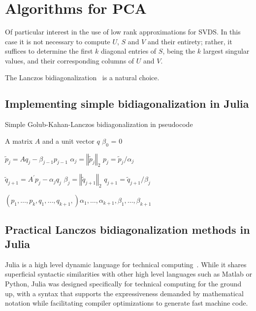\documentclass[review]{siamart0516}
\begin{document}
\section{Algorithms for PCA}

Of particular interest in the use of low rank approximations for SVDS.
In this case it is not necessary to compute $U$, $S$ and $V$ and
their entirety; rather, it suffices to determine the first $k$ diagonal
entries of $S$, being the $k$ largest singular values, and their
corresponding columns of $U$ and $V$.

The Lanczos bidiagonalization~\cite{Golub1965} is a natural choice.

\subsection{Implementing simple bidiagonalization in Julia}

\begin{algorithm}
\caption{Simple Golub-Kahan-Lanczos bidiagonalization in pseudocode}

\begin{algorithmic}
\REQUIRE A matrix $A$ and a unit vector $q$
\STATE $\beta_0$ = 0

\STATE $\tilde{p}_j = A q_j - \beta_{j-1} p_{j-1}$
\STATE $\alpha_j = \left\Vert \tilde{p}_j \right\Vert_2$
\STATE $p_j = \tilde{p}_j / \alpha_j$

\STATE $\tilde{q}_{j+1} = A^\prime p_j - \alpha_j q_j$
\STATE $\beta_j = \left\Vert \tilde{q}_{j+1} \right\Vert_2$
\STATE $q_{j+1} = \tilde{q}_{j+1} / \beta_j$

\ENDFOR
\RETURN $\left(p_1, \dots, p_k, q_1, \dots, q_{k+1},\right) \alpha_1, \dots, \alpha_{k+1}, \beta_1, \dots, \beta_{k+1}$
\end{algorithmic}
\end{algorithm}


\subsection{Practical Lanczos bidiagonalization methods in Julia}

Julia is a high level dynamic language for technical
computing~\cite{Bezanson2012,Bezanson2015}. While it shares superficial
syntactic similarities with other high level languages such as Matlab or
Python, Julia was designed specifically for technical computing for the ground
up, with a syntax that supports the expressiveness demanded by mathematical
notation while facilitating compiler optimizations to generate fast machine
code.
\end{document}
